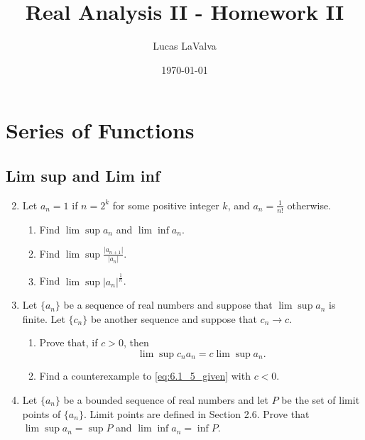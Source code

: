 \documentclass{article}
\title{Real Analysis II - Homework II}
\author{Lucas LaValva}
\date{\today}
\begin{document}
\maketitle

\setcounter{section}{5}

\section{Series of Functions}

\subsection{Lim sup and Lim inf}
\begin{enumerate}
      \setcounter{enumi}{1}
      \item Let $a_n=1$ if $n=2^k$ for some positive integer $k$,
            and $a_n=\frac{1}{n!}$ otherwise.
            \begin{enumerate}
                  \item Find $\lim\sup a_n$ and $\lim\inf a_n$.
                  \item Find $\lim\sup\frac{\lvert a_{n+1}\rvert}{\lvert a_n\rvert}$.
                  \item Find $\lim\sup\lvert a_n\rvert^\frac{1}{n}$.
            \end{enumerate}
            \setcounter{enumi}{4}
      \item Let $\{a_n\}$ be a sequence of real numbers and suppose
            that $\lim\sup a_n$ is finite. Let $\{c_n\}$ be another
            sequence and suppose that $c_n\to c$.
            \begin{enumerate}
                  \item Prove that, if $c>0$, then
                        \begin{equation}
                              \lim\sup c_na_n = c\lim\sup a_n.
                              \label{eq:6.1_5_given}
                        \end{equation}
                  \item Find a counterexample to \eqref{eq:6.1_5_given}
                        with $c<0$.
            \end{enumerate}
            \setcounter{enumi}{8}
      \item Let $\{a_n\}$ be a bounded sequence of real numbers and
            let $P$ be the set of limit points of $\{a_n\}$. Limit
            points are defined in Section 2.6. Prove that
            $\lim\sup a_n=\sup P$ and $\lim\inf a_n=\inf P$.
\end{enumerate}
\end{document}
